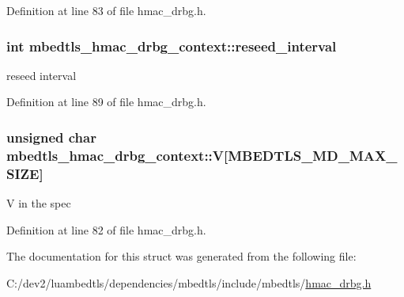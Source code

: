 Definition at line 83 of file hmac\-\_\-drbg.\-h.

\hypertarget{structmbedtls__hmac__drbg__context_aa69d31aabb0c213dd5f3ea38b8f3f1ad}{
\subsubsection[{reseed\-\_\-interval}]{\setlength{\rightskip}{0pt plus 5cm}int mbedtls\-\_\-hmac\-\_\-drbg\-\_\-context\-::reseed\-\_\-interval}}\label{structmbedtls__hmac__drbg__context_aa69d31aabb0c213dd5f3ea38b8f3f1ad}
reseed interval 

Definition at line 89 of file hmac\-\_\-drbg.\-h.

\hypertarget{structmbedtls__hmac__drbg__context_a3e426c343012174c037a462535d23715}{
\subsubsection[{V}]{\setlength{\rightskip}{0pt plus 5cm}unsigned char mbedtls\-\_\-hmac\-\_\-drbg\-\_\-context\-::\-V\mbox{[}M\-B\-E\-D\-T\-L\-S\-\_\-\-M\-D\-\_\-\-M\-A\-X\-\_\-\-S\-I\-Z\-E\mbox{]}}}\label{structmbedtls__hmac__drbg__context_a3e426c343012174c037a462535d23715}
V in the spec 

Definition at line 82 of file hmac\-\_\-drbg.\-h.



The documentation for this struct was generated from the following file\-:\begin{DoxyCompactItemize}
\item 
C\-:/dev2/luambedtls/dependencies/mbedtls/include/mbedtls/\hyperlink{hmac__drbg_8h}{hmac\-\_\-drbg.\-h}\end{DoxyCompactItemize}
